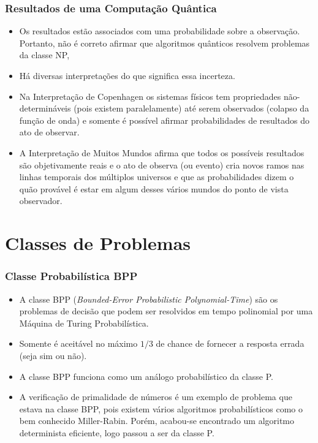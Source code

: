 \documentclass{beamer}
\begin{document}
\begin{frame}
\frametitle{Resultados de uma Computação Quântica}
\begin{itemize}
  \item Os resultados estão associados com
  uma probabilidade sobre a observação. Portanto, não é correto
  afirmar que algoritmos quânticos resolvem problemas da classe NP,
  \item Há diversas interpretações do que significa essa incerteza.
  \item Na Interpretação de Copenhagen os sistemas físicos tem
  propriedades não-determináveis (pois existem paralelamente) até
  serem observados (colapso da função de onda) e somente é possível
  afirmar probabilidades de resultados do ato de observar.
  \item A Interpretação de Muitos Mundos afirma que todos os possíveis
  resultados são objetivamente reais e o ato de observa (ou evento)
  cria novos ramos nas linhas temporais dos múltiplos universos e que
  as probabilidades dizem o quão provável é estar em algum desses
  vários mundos do ponto de vista observador.
\end{itemize}
\end{frame}

\section{Classes de Problemas}

\begin{frame}
\frametitle{Classe Probabilística BPP} 
\begin{itemize}
  \item A classe BPP (\textit{Bounded-Error Probabilistic
    Polynomial-Time}) são os problemas de decisão que podem ser
  resolvidos em tempo polinomial por uma Máquina de Turing
  Probabilística.
  \item Somente é aceitável no máximo $1/3$ de chance de fornecer a
  resposta errada (seja sim ou não).
  \item A classe BPP funciona como um análogo probabilístico da classe P.
  \item A verificação de primalidade de números é um exemplo de
    problema que estava na classe BPP, pois existem vários algoritmos
    probabilísticos como o bem conhecido Miller-Rabin. Porém,
    acabou-se encontrado um algoritmo determinista eficiente, logo
    passou a ser da classe P.
\end{itemize}
\end{frame}
\end{document}
